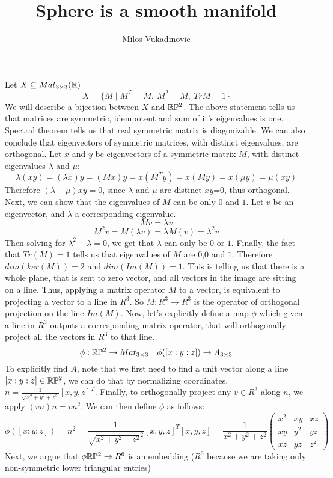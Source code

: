 \documentclass[11pt,a4paper]{report}
\author{Milos Vukadinovic}
\title{Sphere is a smooth manifold}
\begin{document}
Let $X \subseteq Mat_{3 \times 3}(\mathbb{R})$ 
$$ X = \{ M \mid M^T = M, \: M^2 = M,\: Tr M = 1 \}$$
We will describe a bijection between $X$ and $\mathbb{R} \mathbb{P}^2$.
The above statement tells us that matrices are symmetric, idempotent and sum of it's eigenvalues is one.
Spectral theorem tells us that real symmetric matrix is diagonizable.
We can also conclude that eigenvectors of symmetric matrices, with distinct eigenvalues, are orthogonal.
Let $x$ and $y$ be eigenvectors of a symmetric matrix $M$, with distinct eigenvalues $\lambda$ and $\mu$:
$$ \lambda (x y) = (\lambda x) y =  (M x) y = x (M^T y) = x (M y) = x (\mu y) = \mu (x y ) $$
Therefore $(\lambda - \mu) xy = 0$, since $\lambda$ and $\mu$ are distinct $xy$=0, thus orthogonal.
Next, we can show that the eigenvalues of $M$ can be only $0$ and $1$.
Let $v$ be an eigenvector, and $\lambda$ a corresponding eigenvalue.
$$ M v = \lambda v $$
$$ M^2 v = M (\lambda v) = \lambda M (v) = \lambda^2 v $$
Then solving for $\lambda^2-\lambda = 0$, we get that $\lambda$ can only be $0$ or $1$.
Finally, the fact that $Tr(M)=1$ tells us that eigenvalues of $M$ are $0$,$0$ and $1$.
Therefore $dim(ker(M)) = 2$ and $dim(Im(M)) = 1 $. This is telling us that there is a whole plane,
that is sent to zero vector, and all vectors in the image are sitting on a line.
\newline
Thus, applying a matrix operator $M$ to a vector,
is equivalent to projecting a vector to a line in $R^3$.
So $M :R^3 \to R^3$ is the operator of orthogonal projection on the line $Im(M)$.
\newline
Now, let's explicitly define a map $\phi$ which given a line in $R^3$ outputs a corresponding matrix operator,
that will orthogonally project all the vectors in $R^3$ to that line.
$$ \phi: \mathbb{R} \mathbb{P} ^2 \to Mat_{3 \times 3}  \quad \phi([x:y:z]) \to A_{3 \times 3} $$
To explicitly find $A$, note that we first need to find a unit vector along a line $[x:y:z] \in \mathbb{R} \mathbb{P} ^2$,
we can do that by normalizing coordinates. $n = \frac{1}{\sqrt{x^2 + y^2 + z^2}} [x,y,z]^T $.
Finally, to orthogonally project any $v \in R^3$ along $n$, we apply $(v n) n = v n^2$. We can then define $\phi$ as follows:
$$ \phi([x:y:z]) = n^2 = \frac{1}{\sqrt{x^2+y^2+z^2}^2} [x,y,z]^T [x,y,z] = \frac{1}{x^2 + y^2 + z^2} 
\begin{pmatrix}
x^2 & xy & xz \\
xy & y^2 & yz  \\
xz & yz & z^2
\end{pmatrix} $$
Next, we argue that $\phi \mathbb{R} \mathbb{P} ^2 \to R^6$ is an embedding ($R^6$ because we are taking only non-symmetric lower triangular entries)
\end{document}

